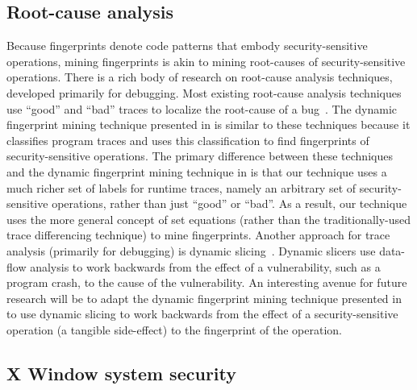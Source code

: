 \subsection{Root-cause analysis}
\label{chapter:relatedwork:root-cause}

Because fingerprints denote code patterns that embody security-sensitive
operations, mining fingerprints is akin to mining root-causes of
security-sensitive operations. There is a rich body of research on root-cause
analysis techniques, developed primarily for debugging.  Most existing root-cause
analysis techniques use ``good'' and ``bad'' traces to localize the root-cause
of a bug~\cite{cz05,l04,z99}. The dynamic fingerprint mining technique
presented in  is similar to these techniques because
it classifies program traces and uses this classification to find fingerprints
of security-sensitive operations. The primary difference between these
techniques and the dynamic fingerprint mining technique in
 is that our technique uses a much richer set of
labels for runtime traces, namely an arbitrary set of security-sensitive
operations, rather than just ``good'' or ``bad''. As a result, our technique
uses the more general concept of set equations (rather than the
traditionally-used trace differencing technique) to mine fingerprints.  Another
approach for trace analysis (primarily for debugging) is dynamic
slicing~\cite{ah90,kr97,zg03}.  Dynamic slicers use data-flow analysis to work
backwards from the effect of a vulnerability, such as a program crash, to the
cause of the vulnerability. An interesting avenue for future research will be
to adapt the dynamic fingerprint mining technique presented in
 to use dynamic slicing to work backwards from the
effect of a security-sensitive operation (a tangible side-effect) to the
fingerprint of the operation.

\subsection{X Window system security}
\label{chapter:relatedwork:xwindow}

